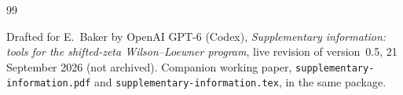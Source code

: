 \begin{thebibliography}{99}
\raggedright
{}
Drafted for E.~Baker by OpenAI GPT-6 (Codex),
\emph{Supplementary information: tools for the shifted-zeta
Wilson--Loewner program}, live revision of version~0.5, 21 September 2026 (not archived).
Companion working paper, \nolinkurl{supplementary-information.pdf}
and \nolinkurl{supplementary-information.tex}, in the same package.

\end{thebibliography}

